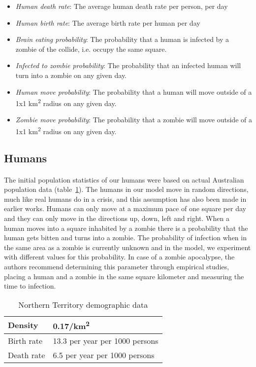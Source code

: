 \documentclass{report}
\begin{document}
\begin{itemize}
\item \emph{Human death rate}: The average human death rate per person, per day
\item \emph{Human birth rate}: The average birth rate per human per day
\item \emph{Brain eating probability}: The probability that a human is infected by a zombie of the collide, i.e. occupy the same square.
\item \emph{Infected to zombie probability}: The probability that an infected human will turn into a zombie on any given day.
\item \emph{Human move probability}: The probability that a human will move outside of a 1x1 km\textsuperscript{2} radius on any given day.
\item \emph{Zombie move probability}: The probability that a zombie will move outside of a 1x1 km\textsuperscript{2} radius on any given day.
\end{itemize}

\subsection{Humans}
\paragraph{}
The initial population statistics of our humans were based on actual Australian population data (table~\ref{AustralianData}). The humans in our model move in random directions, much like real humans do in a crisis, and this assumption has also been made in earlier works\cite{munz}. Humans can only move at a maximum pace of one square per day and they can only move in the directions up, down, left and right. When a human moves into a square inhabited by a zombie there is a probability that the human gets bitten and turns into a zombie. The probability of infection when in the same area as a zombie is currently unknown and in the model, we experiment with different values for this probability. In case of a zombie apocalypse, the authors recommend determining this parameter through empirical studies, placing a human and a zombie in the same square kilometer and measuring the time to infection.
\begin{table}[!h]
    \begin{tabular}{|l|l|}
      \hline
        Density    & 0.17/km\textsuperscript{2} \\
      \hline
        Birth rate & 13.3 per year per 1000 persons \\
      \hline
        Death rate & 6.5 per year per 1000 persons \\
      \hline
\end{tabular}
\caption{Northern Territory demographic data}\label{AustralianData}
\end{table}
\end{document}
